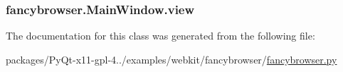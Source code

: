 \subsubsection[{view}]{\setlength{\rightskip}{0pt plus 5cm}fancybrowser.\+Main\+Window.\+view}\label{classfancybrowser_1_1MainWindow_a954182d9aa2d9e4772d3b0675a0b930d}


The documentation for this class was generated from the following file\+:\begin{DoxyCompactItemize}
\item 
packages/\+Py\+Qt-\/x11-\/gpl-\/4../examples/webkit/fancybrowser/\hyperlink{fancybrowser_8py}{fancybrowser.\+py}\end{DoxyCompactItemize}
